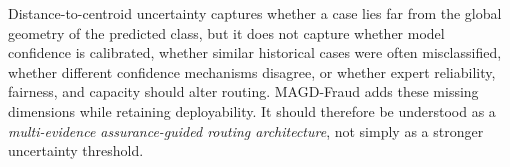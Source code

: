 Distance-to-centroid uncertainty captures whether a case lies far from the global geometry of the predicted class, but it does not capture whether model confidence is calibrated, whether similar historical cases were often misclassified, whether different confidence mechanisms disagree, or whether expert reliability, fairness, and capacity should alter routing. MAGD-Fraud adds these missing dimensions while retaining deployability. It should therefore be understood as a \emph{multi-evidence assurance-guided routing architecture}, not simply as a stronger uncertainty threshold.
